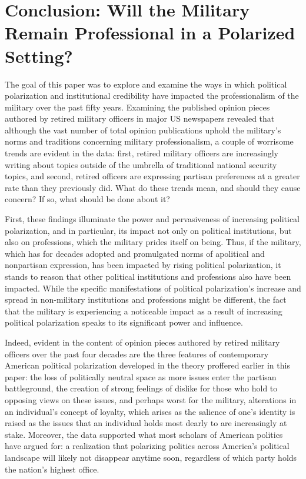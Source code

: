 \documentclass[12pt,]{article}
\begin{document}
\hypertarget{conclusion-will-the-military-remain-professional-in-a-polarized-setting}{%
\section{Conclusion: Will the Military Remain Professional in a Polarized Setting?}\label{conclusion-will-the-military-remain-professional-in-a-polarized-setting}}

The goal of this paper was to explore and examine the ways in which political polarization and institutional credibility have impacted the professionalism of the military over the past fifty years. Examining the published opinion pieces authored by retired military officers in major US newspapers revealed that although the vast number of total opinion publications uphold the military's norms and traditions concerning military professionalism, a couple of worrisome trends are evident in the data: first, retired military officers are increasingly writing about topics outside of the umbrella of traditional national security topics, and second, retired officers are expressing partisan preferences at a greater rate than they previously did. What do these trends mean, and should they cause concern? If so, what should be done about it?

First, these findings illuminate the power and pervasiveness of increasing political polarization, and in particular, its impact not only on political institutions, but also on professions, which the military prides itself on being. Thus, if the military, which has for decades adopted and promulgated norms of apolitical and nonpartisan expression, has been impacted by rising political polarization, it stands to reason that other political institutions and professions also have been impacted. While the specific manifestations of political polarization's increase and spread in non-military institutions and professions might be different, the fact that the military is experiencing a noticeable impact as a result of increasing political polarization speaks to its significant power and influence.

Indeed, evident in the content of opinion pieces authored by retired military officers over the past four decades are the three features of contemporary American political polarization developed in the theory proffered earlier in this paper: the loss of politically neutral space as more issues enter the partisan battleground, the creation of strong feelings of dislike for those who hold to opposing views on these issues, and perhaps worst for the military, alterations in an individual's concept of loyalty, which arises as the salience of one's identity is raised as the issues that an individual holds most dearly to are increasingly at stake. Moreover, the data supported what most scholars of American politics have argued for: a realization that polarizing politics across America's political landscape will likely not disappear anytime soon, regardless of which party holds the nation's highest office.
\end{document}
